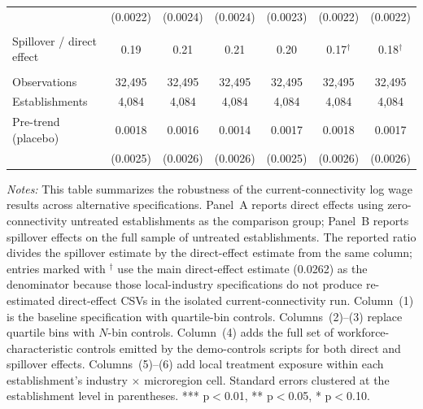 \begin{table}[H]
\begin{tabular}{lcccccc}
 & (0.0022) & (0.0024) & (0.0024) & (0.0023) & (0.0022) & (0.0022)\\
 &  &  &  &  &  & \\
Spillover / direct effect & 0.19 & 0.21 & 0.21 & 0.20 & 0.17$^\dagger$ & 0.18$^\dagger$\\
 &  &  &  &  &  & \\
Observations & 32{,}495 & 32{,}495 & 32{,}495 & 32{,}495 & 32{,}495 & 32{,}495\\
Establishments & 4{,}084 & 4{,}084 & 4{,}084 & 4{,}084 & 4{,}084 & 4{,}084\\
\midrule
Pre-trend (placebo) & 0.0018 & 0.0016 & 0.0014 & 0.0017 & 0.0018 & 0.0017\\
 & (0.0025) & (0.0026) & (0.0026) & (0.0025) & (0.0026) & (0.0026)\\
\bottomrule\bottomrule
\end{tabular}
\begin{minipage}{\linewidth}
    \scriptsize\vspace{4pt}
    \textit{Notes:} This table summarizes the robustness of the current-connectivity log wage results across alternative specifications. Panel~A reports direct effects using zero-connectivity untreated establishments as the comparison group; Panel~B reports spillover effects on the full sample of untreated establishments. The reported ratio divides the spillover estimate by the direct-effect estimate from the same column; entries marked with $^\dagger$ use the main direct-effect estimate (0.0262) as the denominator because those local-industry specifications do not produce re-estimated direct-effect CSVs in the isolated current-connectivity run. Column~(1) is the baseline specification with quartile-bin controls. Columns~(2)--(3) replace quartile bins with $N$-bin controls. Column~(4) adds the full set of workforce-characteristic controls emitted by the demo-controls scripts for both direct and spillover effects. Columns~(5)--(6) add local treatment exposure within each establishment's industry $\times$ microregion cell. Standard errors clustered at the establishment level in parentheses. *** p$<$0.01, ** p$<$0.05, * p$<$0.10.
\end{minipage}
\end{table}
